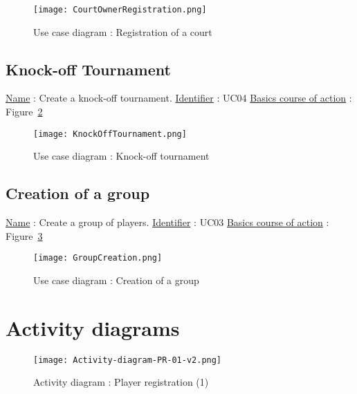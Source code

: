 \begin{figure}[!ht]
    \centering
    \texttt{[image: CourtOwnerRegistration.png]}
    \caption{Use case diagram : Registration of a court}
    \label{courtownerregfig}
\end{figure}
\FloatBarrier

\subsection{Knock-off Tournament}

\noindent \underline{Name} : Create a knock-off tournament. \newline
\underline{Identifier} : UC04 \newline
\underline{Basics course of action} : Figure~\ref{knockofftournamentfig}\newline

\begin{figure}[!ht]
    \centering
    \texttt{[image: KnockOffTournament.png]}
    \caption{Use case diagram : Knock-off tournament}
    \label{knockofftournamentfig}
\end{figure}
\FloatBarrier

\subsection{Creation of a group}

\noindent \underline{Name} : Create a group of players. \newline
\underline{Identifier} : UC03 \newline
\underline{Basics course of action} : Figure~\ref{groupcreationfig} \newline

\begin{figure}[!ht]
    \centering
    \texttt{[image: GroupCreation.png]}
    \caption{Use case diagram : Creation of a group}
    \label{groupcreationfig}
\end{figure}
\FloatBarrier

\section{Activity diagrams}


\begin{figure}[!ht]
    \centering
    \texttt{[image: Activity-diagram-PR-01-v2.png]}
    \caption{Activity diagram : Player registration (1)}
\end{figure}

